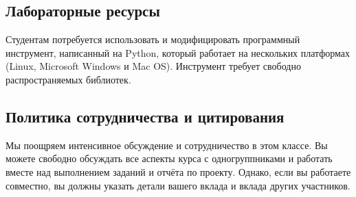 \documentclass[11pt,a4paper]{article}
\begin{document}
\subsection{Лабораторные ресурсы}
Студентам потребуется использовать и модифицировать программный инструмент, написанный на Python, который работает на нескольких платформах (Linux, Microsoft Windows и Mac OS). Инструмент требует свободно распространяемых библиотек.

\subsection{Политика сотрудничества и цитирования}
Мы поощряем интенсивное обсуждение и сотрудничество в этом классе. Вы можете свободно обсуждать все аспекты курса с одногруппниками и работать вместе над выполнением заданий и отчёта по проекту. Однако, если вы работаете совместно, вы должны указать детали вашего вклада и вклада других участников.
\end{document}
